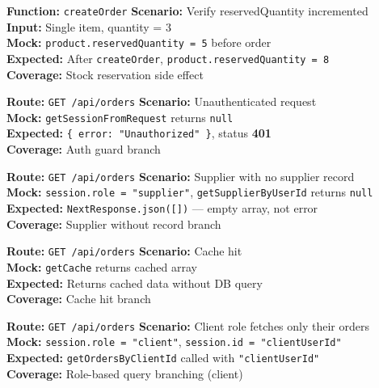 \documentclass[12pt,a4paper]{report}
\newcommand{\pone}{\textbf{\color{p1red}P1}}
\newcommand{\ptwo}{\textbf{\color{p2orange}P2}}
\begin{document}
\begin{tcolorbox}[testbox,title={ORD-011 \hfill \ptwo}]
\textbf{Function:} \texttt{createOrder} \quad \textbf{Scenario:} Verify reservedQuantity incremented \\
\textbf{Input:} Single item, quantity = 3 \\
\textbf{Mock:} \texttt{product.reservedQuantity = 5} before order \\
\textbf{Expected:} After \texttt{createOrder}, \texttt{product.reservedQuantity = 8} \\
\textbf{Coverage:} Stock reservation side effect
\end{tcolorbox}

\begin{tcolorbox}[testbox,title={ORD-012 \hfill \pone}]
\textbf{Route:} \texttt{GET /api/orders} \quad \textbf{Scenario:} Unauthenticated request \\
\textbf{Mock:} \texttt{getSessionFromRequest} returns \texttt{null} \\
\textbf{Expected:} \texttt{\{ error: "Unauthorized" \}}, status \textbf{401} \\
\textbf{Coverage:} Auth guard branch
\end{tcolorbox}

\begin{tcolorbox}[testbox,title={ORD-013 \hfill \ptwo}]
\textbf{Route:} \texttt{GET /api/orders} \quad \textbf{Scenario:} Supplier with no supplier record \\
\textbf{Mock:} \texttt{session.role = "supplier"}, \texttt{getSupplierByUserId} returns \texttt{null} \\
\textbf{Expected:} \texttt{NextResponse.json([])} --- empty array, not error \\
\textbf{Coverage:} Supplier without record branch
\end{tcolorbox}

\begin{tcolorbox}[testbox,title={ORD-014 \hfill \ptwo}]
\textbf{Route:} \texttt{GET /api/orders} \quad \textbf{Scenario:} Cache hit \\
\textbf{Mock:} \texttt{getCache} returns cached array \\
\textbf{Expected:} Returns cached data without DB query \\
\textbf{Coverage:} Cache hit branch
\end{tcolorbox}

\begin{tcolorbox}[testbox,title={ORD-015 \hfill \ptwo}]
\textbf{Route:} \texttt{GET /api/orders} \quad \textbf{Scenario:} Client role fetches only their orders \\
\textbf{Mock:} \texttt{session.role = "client"}, \texttt{session.id = "clientUserId"} \\
\textbf{Expected:} \texttt{getOrdersByClientId} called with \texttt{"clientUserId"} \\
\textbf{Coverage:} Role-based query branching (client)
\end{tcolorbox}
\end{document}
